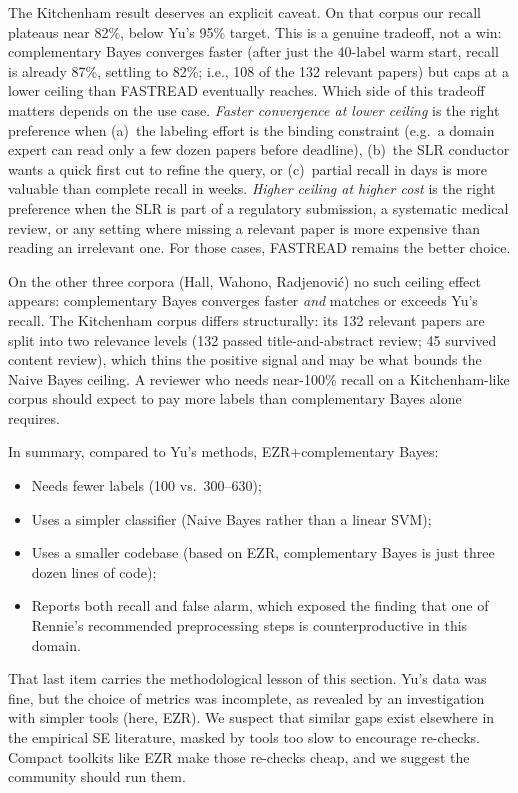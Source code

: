 \documentclass[AMA,STIX2COL]{WileyNJDv5}
\newcommand{\NEW}[1]{\textcolor{newblue}{#1}}
\newcommand{\IT}{{\sffamily EZR}}
\begin{document}
The Kitchenham result deserves an explicit caveat. On that
corpus our recall plateaus near 82\%, below Yu's 95\%
target. This is a genuine tradeoff, not a win:
complementary Bayes converges faster \NEW{(after just the
40-label warm start, recall is already 87\%, settling to 82\%;
i.e., 108 of the 132 relevant papers)} but caps at a lower
ceiling than FASTREAD eventually reaches. Which side of
this tradeoff matters depends on the use case. {\em
Faster convergence at lower ceiling} is the right
preference when (a)~the labeling effort is the binding
constraint (e.g.\ a domain expert can read only a few dozen
papers before deadline), (b)~the SLR conductor wants a
quick first cut to refine the query, or (c)~partial recall
in days is more valuable than complete recall in weeks.
{\em Higher ceiling at higher cost} is the right preference
when the SLR is part of a regulatory submission, a
systematic medical review, or any setting where missing a
relevant paper is more expensive than reading an irrelevant
one. For those cases, FASTREAD remains the better choice.

On the other three corpora (Hall, Wahono, Radjenovi\'c) no
such ceiling effect appears: complementary Bayes converges
faster {\em and} matches or exceeds Yu's recall. The
Kitchenham corpus differs structurally: its 132 relevant
papers are split into two relevance levels (132 passed
title-and-abstract review; 45 survived content review),
which thins the positive signal and may be what bounds the
Naive Bayes ceiling. A reviewer who needs near-100\%
recall on a Kitchenham-like corpus should expect to pay
more labels than complementary Bayes alone requires.

In summary, compared to Yu's methods, EZR+complementary Bayes:
\begin{itemize}
\item Needs fewer labels (100 vs.\ \NEW{300--630});
\item Uses a simpler classifier (Naive Bayes rather than a
  linear SVM);
\item Uses a smaller codebase (based on EZR, complementary
Bayes is just three dozen lines of code);
\item Reports both recall and false alarm, which exposed the
  finding that one of Rennie's recommended preprocessing
  steps is counterproductive in this domain.
\end{itemize}

That last item carries the methodological lesson of this
section. Yu's data was fine, but the choice of metrics was
incomplete, as revealed by an investigation with simpler tools
(here, \IT{}).
We suspect that
similar gaps exist elsewhere in the empirical SE literature,
masked by tools too slow to encourage re-checks. Compact
toolkits like EZR make those re-checks cheap, and we suggest
the community should run them.
\end{document}
